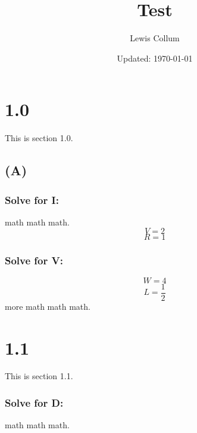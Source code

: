 \documentclass[fleqn]{article}
\author{Lewis Collum}
\date{Updated: \today}
\title{Test}
\begin{document}
\maketitle

\section{1.0}
This is section 1.0.
\subsection{(A)}
\subsubsection{Solve for I:}
math math math.
\[V=2\]
\[R=1\]
\subsubsection{Solve for V:}
\noindent\[W=4\]
\[L=\frac{1}{2}\]
more math math math.


\section*{1.1}
This is section 1.1.
\subsubsection*{Solve for D:}
math math math.
\end{document}
